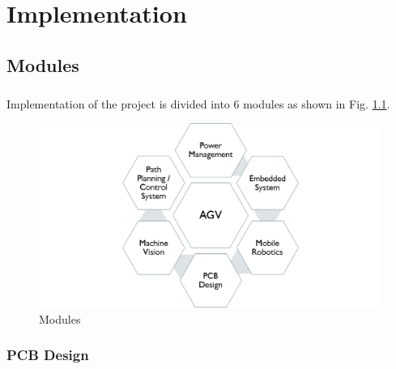 \chapter{Implementation}

\section{Modules}
\paragraph{}Implementation of the project is divided into 6 modules as shown in Fig. \ref{modules}.

\begin{figure}[H]
\centering
\includegraphics[width = \textwidth]{project/images/modules.png}
\caption{Modules} \label{modules}
\end{figure}

\newpage

\subsection{PCB Design}

